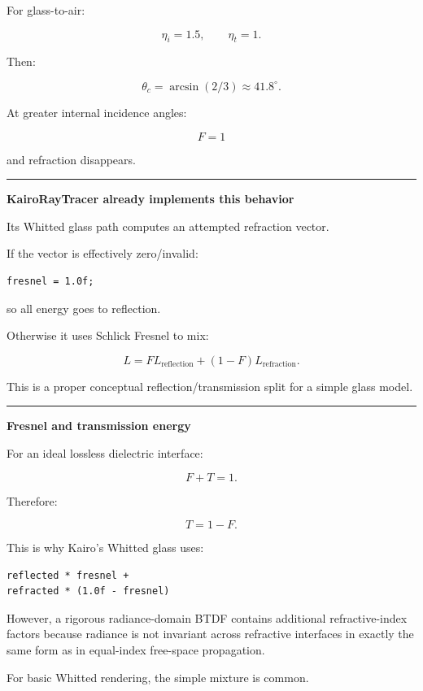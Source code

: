 For glass-to-air:

\[
\eta_i=1.5,
\qquad
\eta_t=1.
\]

Then:

\[
\theta_c=
\arcsin(2/3)
\approx41.8^\circ.
\]

At greater internal incidence angles:

\[
\boxed{
F=1
}
\]

and refraction disappears.

\begin{center}\rule{0.5\linewidth}{0.5pt}\end{center}

\textbf{KairoRayTracer already implements this behavior}

Its Whitted glass path computes an attempted refraction vector.

If the vector is effectively zero/invalid:

\begin{verbatim}
fresnel = 1.0f;
\end{verbatim}

so all energy goes to reflection.

Otherwise it uses Schlick Fresnel to mix:

\[
L=
F L_{\text{reflection}}
+
(1-F)L_{\text{refraction}}.
\]

This is a proper conceptual reflection/transmission split for a simple glass model.

\begin{center}\rule{0.5\linewidth}{0.5pt}\end{center}

\textbf{Fresnel and transmission energy}

For an ideal lossless dielectric interface:

\[
\boxed{
F+T=1.
}
\]

Therefore:

\[
T=1-F.
\]

This is why Kairo's Whitted glass uses:

\begin{verbatim}
reflected * fresnel +
refracted * (1.0f - fresnel)
\end{verbatim}

However, a rigorous radiance-domain BTDF contains additional refractive-index factors because radiance is not invariant across refractive interfaces in exactly the same form as in equal-index free-space propagation.

For basic Whitted rendering, the simple mixture is common.

